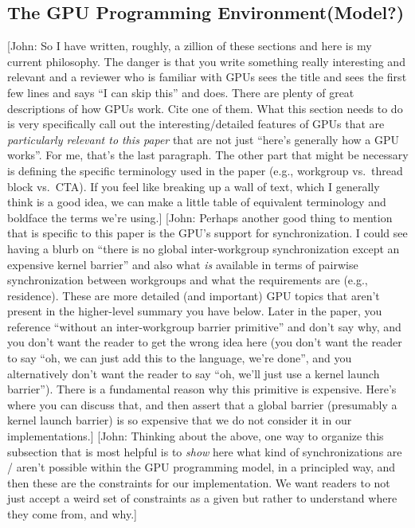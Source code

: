 \documentclass[sigconf]{acmart}
\newcommand{\john}[1]{{\footnotesize\color{cyan}[John: #1]}}
\begin{document}
\subsection{The GPU Programming Environment(Model?)}
\john{So I have written, roughly, a zillion of these sections and here is my current philosophy. The danger is that you write something really interesting and relevant and a reviewer who is familiar with GPUs sees the title and sees the first few lines and says ``I can skip this'' and does. There are plenty of great descriptions of how GPUs work. Cite one of them. What this section needs to do is very specifically call out the interesting/detailed features of GPUs that are \emph{particularly relevant to this paper} that are not just ``here's generally how a GPU works''. For me, that's the last paragraph. The other part that might be necessary is defining the specific terminology used in the paper (e.g., workgroup vs.\ thread block vs.\ CTA). If you feel like breaking up a wall of text, which I generally think is a good idea, we can make a little table of equivalent terminology and boldface the terms we're using.} \john{Perhaps another good thing to mention that is specific to this paper is the GPU's support for synchronization. I could see having a blurb on ``there is no global inter-workgroup synchronization except an expensive kernel barrier'' and also what \emph{is} available in terms of pairwise synchronization between workgroups and what the requirements are (e.g., residence). These are more detailed (and important) GPU topics that aren't present in the higher-level summary you have below. Later in the paper, you reference ``without an inter-workgroup barrier primitive'' and don't say why, and you don't want the reader to get the wrong idea here (you don't want the reader to say ``oh, we can just add this to the language, we're done'', and you alternatively don't want the reader to say ``oh, we'll just use a kernel launch barrier''). There is a fundamental reason why this primitive is expensive. Here's where you can discuss that, and then assert that a global barrier (presumably a kernel launch barrier) is so expensive that we do not consider it in our implementations.} \john{Thinking about the above, one way to organize this subsection that is most helpful is to \emph{show} here what kind of synchronizations are / aren't possible within the GPU programming model, in a principled way, and then these are the constraints for our implementation. We want readers to not just accept a weird set of constraints as a given but rather to understand where they come from, and why.}
\end{document}
